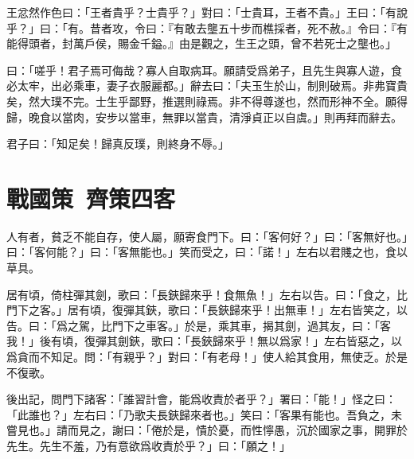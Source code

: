 王忿然作色曰：「王者貴乎？士貴乎？」對曰：「士貴耳，王者不貴。」王曰：「有說乎？」曰：「有。昔者攻，令曰：『有敢去壟五十步而樵採者，死不赦。』令曰：『有能得頭者，封萬戶侯，賜金千鎰。』由是觀之，生王之頭，曾不若死士之壟也。」

曰：「嗟乎！君子焉可侮哉？寡人自取病耳。願請受爲弟子，且先生與寡人遊，食必太牢，出必乘車，妻子衣服麗都。」辭去曰：「夫玉生於山，制則破焉。非弗寶貴矣，然大璞不完。士生乎鄙野，推選則祿焉。非不得尊遂也，然而形神不全。願得歸，晚食以當肉，安步以當車，無罪以當貴，清淨貞正以自虞。」則再拜而辭去。

君子曰：「知足矣！歸真反璞，則終身不辱。」

\theendnotes

\section[馮煖客孟嘗君\quad {\small 戰國策\ 齊策四}]{{\normalsize 戰國策\ 齊策四}\quad {}客}
人有者，貧乏不能自存，使人屬，願寄食門下。曰：「客何好？」曰：「客無好也。」曰：「客何能？」曰：「客無能也。」笑而受之，曰：「諾！」左右以君賤之也，食以草具。

居有頃，倚柱彈其劍，歌曰：「長鋏歸來乎！食無魚！」左右以告。曰：「食之，比門下之客。」居有頃，復彈其鋏，歌曰：「長鋏歸來乎！出無車！」左右皆笑之，以告。曰：「爲之駕，比門下之車客。」於是，乘其車，揭其劍，過其友，曰：「客我！」後有頃，復彈其劍鋏，歌曰：「長鋏歸來乎！無以爲家！」左右皆惡之，以爲貪而不知足。問：「有親乎？」對曰：「有老母！」使人給其食用，無使乏。於是不復歌。

後出記，問門下諸客：「誰習計會，能爲收責於者乎？」署曰：「能！」怪之曰：「此誰也？」左右曰：「乃歌夫長鋏歸來者也。」笑曰：「客果有能也。吾負之，未嘗見也。」請而見之，謝曰：「倦於是，憒於憂，而性懧愚，沉於國家之事，開罪於先生。先生不羞，乃有意欲爲收責於乎？」曰：「願之！」

